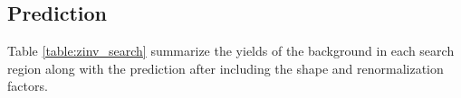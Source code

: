 


\subsection{Prediction}\label{subsec:znunuprediction}


Table \ref{table:zinv_search} summarize the yields of the \Znunu{} background in each search region along with the prediction after including the shape and renormalization factors. 



